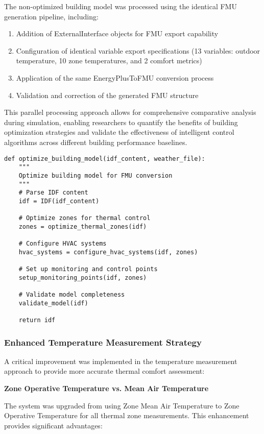 \documentclass[12pt,a4paper]{article}
\begin{document}
The non-optimized building model was processed using the identical FMU generation pipeline, including:
\begin{enumerate}
    \item Addition of ExternalInterface objects for FMU export capability
    \item Configuration of identical variable export specifications (13 variables: outdoor temperature, 10 zone temperatures, and 2 comfort metrics)
    \item Application of the same EnergyPlusToFMU conversion process
    \item Validation and correction of the generated FMU structure
\end{enumerate}

This parallel processing approach allows for comprehensive comparative analysis during simulation, enabling researchers to quantify the benefits of building optimization strategies and validate the effectiveness of intelligent control algorithms across different building performance baselines.

\begin{lstlisting}[style=python, caption=Building Model Optimization Process]
def optimize_building_model(idf_content, weather_file):
    """
    Optimize building model for FMU conversion
    """
    # Parse IDF content
    idf = IDF(idf_content)
    
    # Optimize zones for thermal control
    zones = optimize_thermal_zones(idf)
    
    # Configure HVAC systems
    hvac_systems = configure_hvac_systems(idf, zones)
    
    # Set up monitoring and control points
    setup_monitoring_points(idf, zones)
    
    # Validate model completeness
    validate_model(idf)
    
    return idf
\end{lstlisting}

\subsubsection{Enhanced Temperature Measurement Strategy}

A critical improvement was implemented in the temperature measurement approach to provide more accurate thermal comfort assessment:

\textbf{Zone Operative Temperature vs. Mean Air Temperature}

The system was upgraded from using Zone Mean Air Temperature to Zone Operative Temperature for all thermal zone measurements. This enhancement provides significant advantages:
\end{document}
